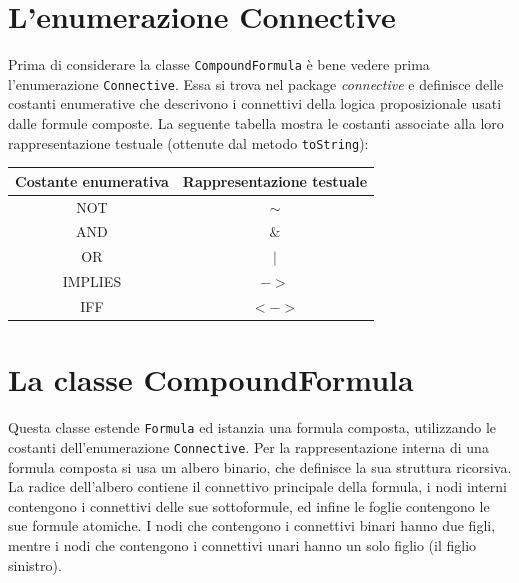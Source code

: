 \documentclass[a4paper,12pt]{report}
\begin{document}
\section{L'enumerazione Connective}
Prima di considerare la classe \texttt{CompoundFormula} è bene vedere prima l'enumerazione \texttt{Connective}. Essa si trova nel package \emph{connective} e definisce delle costanti enumerative che descrivono i connettivi della logica proposizionale usati dalle formule composte. La seguente tabella mostra le costanti associate alla loro rappresentazione testuale (ottenute dal metodo \texttt{toString}):
\begin{table}[H]
    \centering
    \begin{tabular}{|c||c|}
        \hline
        \textbf{Costante enumerativa} & \textbf{Rappresentazione testuale} \\
        \hline\hline
        NOT & $\sim$ \\
        \hline
        AND & $\&$ \\
        \hline
        OR & $|$ \\
        \hline
        IMPLIES & $->$ \\
        \hline
        IFF & $<->$ \\
        \hline
    \end{tabular}
\end{table}

\section{La classe CompoundFormula}
Questa classe estende \texttt{Formula} ed istanzia una formula composta, utilizzando le costanti dell'enumerazione \texttt{Connective}. Per la rappresentazione interna di una formula composta si usa un albero binario, che definisce la sua struttura ricorsiva. La radice dell'albero contiene il connettivo principale della formula, i nodi interni contengono i connettivi delle sue sottoformule, ed infine le foglie contengono le sue formule atomiche. I nodi che contengono i connettivi binari hanno due figli, mentre i nodi che contengono i connettivi unari hanno un solo figlio (il figlio sinistro).
\end{document}

